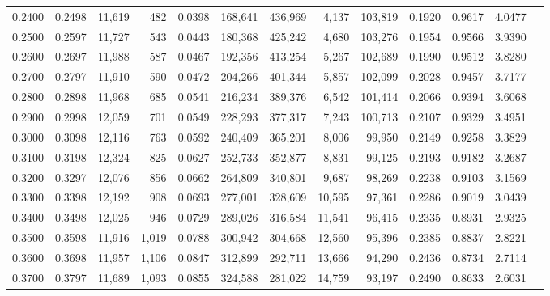 \begin{tabular}{rrrrrrrrrrrrr}
0.2400 & 0.2498 & 11,619 &   482 &                                     0.0398 & 168,641 & 436,969 &   4,137 & 103,819 & 0.1920 & 0.9617 & 4.0477 \\
0.2500 & 0.2597 & 11,727 &   543 &                                     0.0443 & 180,368 & 425,242 &   4,680 & 103,276 & 0.1954 & 0.9566 & 3.9390 \\
0.2600 & 0.2697 & 11,988 &   587 &                                     0.0467 & 192,356 & 413,254 &   5,267 & 102,689 & 0.1990 & 0.9512 & 3.8280 \\
0.2700 & 0.2797 & 11,910 &   590 &                                     0.0472 & 204,266 & 401,344 &   5,857 & 102,099 & 0.2028 & 0.9457 & 3.7177 \\
0.2800 & 0.2898 & 11,968 &   685 &                                     0.0541 & 216,234 & 389,376 &   6,542 & 101,414 & 0.2066 & 0.9394 & 3.6068 \\
0.2900 & 0.2998 & 12,059 &   701 &                                     0.0549 & 228,293 & 377,317 &   7,243 & 100,713 & 0.2107 & 0.9329 & 3.4951 \\
0.3000 & 0.3098 & 12,116 &   763 &                                     0.0592 & 240,409 & 365,201 &   8,006 &  99,950 & 0.2149 & 0.9258 & 3.3829 \\
0.3100 & 0.3198 & 12,324 &   825 &                                     0.0627 & 252,733 & 352,877 &   8,831 &  99,125 & 0.2193 & 0.9182 & 3.2687 \\
0.3200 & 0.3297 & 12,076 &   856 &                                     0.0662 & 264,809 & 340,801 &   9,687 &  98,269 & 0.2238 & 0.9103 & 3.1569 \\
0.3300 & 0.3398 & 12,192 &   908 &                                     0.0693 & 277,001 & 328,609 &  10,595 &  97,361 & 0.2286 & 0.9019 & 3.0439 \\
0.3400 & 0.3498 & 12,025 &   946 &                                     0.0729 & 289,026 & 316,584 &  11,541 &  96,415 & 0.2335 & 0.8931 & 2.9325 \\
0.3500 & 0.3598 & 11,916 & 1,019 &                                     0.0788 & 300,942 & 304,668 &  12,560 &  95,396 & 0.2385 & 0.8837 & 2.8221 \\
0.3600 & 0.3698 & 11,957 & 1,106 &                                     0.0847 & 312,899 & 292,711 &  13,666 &  94,290 & 0.2436 & 0.8734 & 2.7114 \\
0.3700 & 0.3797 & 11,689 & 1,093 &                                     0.0855 & 324,588 & 281,022 &  14,759 &  93,197 & 0.2490 & 0.8633 & 2.6031 \\

\end{tabular}
